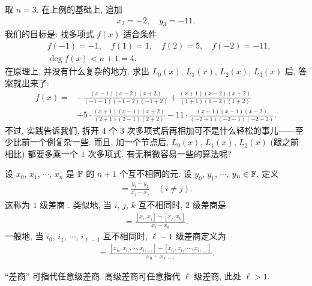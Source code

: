 \begin{example}
    取 $n = 3$. 在上例的基础上, 追加
    \begin{align*}
        x_3 = -2, \quad y_3 = -11.
    \end{align*}
    我们的目标是: 找多项式 $f(x)$ 适合条件
    \begin{align*}
         & f(-1) = -1, \quad f(1) = 1, \quad f(2) = 5, \quad f(-2) = -11, \\
         & \deg f(x) < n + 1 = 4.
    \end{align*}
    在原理上, 并没有什么复杂的地方. 求出 $L_0 (x)$, $L_1 (x)$, $L_2 (x)$, $L_3 (x)$ 后, 答案就出来了:
    \begin{align*}
        f(x)
        = {} & - \frac{(x-1)(x-2)(x+2)}{(-1-1)(-1-2)(-1+2)} + \frac{(x+1)(x-2)(x+2)}{(1+1)(1-2)(1+2)}                   \\
             & + 5 \cdot \frac{(x+1)(x-1)(x+2)}{(2+1)(2-1)(2+2)} - 11 \cdot \frac{(x+1)(x-1)(x-2)}{(-2+1)(-2-1)(-2-2)}.
    \end{align*}
    不过, 实践告诉我们, 拆开 $4$ 个 $3$ 次多项式后再相加可不是什么轻松的事儿——至少比前一个例复杂一些. 而且, 加一个节点后, $L_0 (x)$, $L_1 (x)$, $L_2 (x)$ (跟之前相比) 都要多乘一个 $1$ 次多项式. 有无稍微容易一些的算法呢?
\end{example}

\begin{definition}
    设 $x_0$, $x_1$, $\cdots$, $x_{n}$ 是 $\mathbb{F}$ 的 $n+1$ 个互不相同的元. 设 $y_0$, $y_1$, $\cdots$, $y_{n} \in \mathbb{F}$. 定义
    \begin{align*}
        [x_i, x_j] = \frac{y_i - y_j}{x_i - x_j} \quad (i \neq j).
    \end{align*}
    这称为 $1$ 级差商 . 类似地, 当 $i$, $j$, $k$ 互不相同时, $2$ 级差商是
    \begin{align*}
        [x_i, x_j, x_k] = \frac{[x_i, x_j] - [x_j, x_k]}{x_i - x_k}.
    \end{align*}
    一般地, 当 $i_0$, $i_1$, $\cdots$, $i_{\ell - 1}$ 互不相同时, $\ell - 1$ 级差商定义为
    \begin{align*}
        [x_{i_0}, x_{i_1}, \cdots, x_{i_{\ell - 1}}] = \frac{[x_{i_0}, x_{i_1}, \cdots, x_{i_{\ell - 2}}] - [x_{i_1}, x_{i_2}, \cdots, x_{i_{\ell - 1}}]}{x_0 - x_{\ell - 1}}.
    \end{align*}

    ``差商'' 可指代任意级差商. 高级差商可任意指代 $\ell$ 级差商, 此处 $\ell > 1$.
\end{definition}

